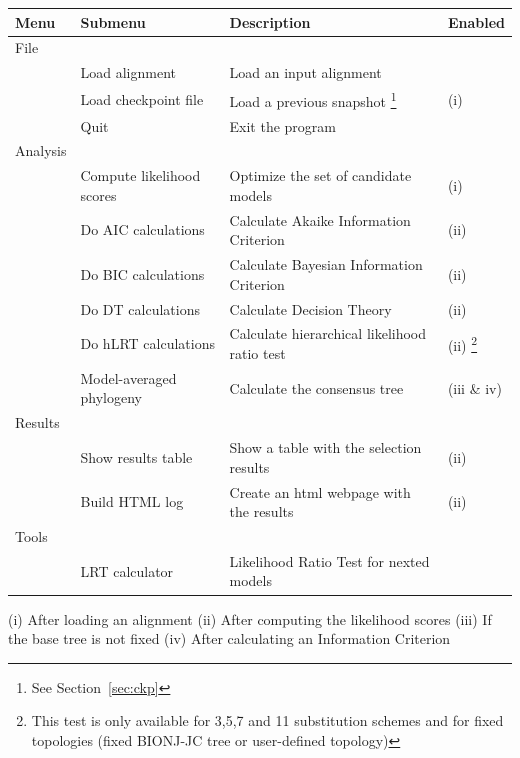 \documentclass[10pt,twoside,a4paper]{article}
\begin{document}
\begin{minipage}{1\textwidth}
\small
\begin{tabular}{l l l l}
\hline
{\bf Menu} & {\bf Submenu} & {\bf Description} & {\bf Enabled} \\
\hline
File \\
& Load alignment & Load an input alignment & \\
& Load checkpoint file & Load a previous snapshot \footnote{See Section~\ref{sec:ckp}} & (i) \\
& Quit & Exit the program & \\
\hline
Analysis \\
& Compute likelihood scores & Optimize the set of candidate models & (i) \\
& Do AIC calculations & Calculate Akaike Information Criterion & (ii) \\
& Do BIC calculations & Calculate Bayesian Information Criterion & (ii) \\
& Do DT calculations & Calculate Decision Theory & (ii) \\
& Do hLRT calculations & Calculate hierarchical likelihood ratio test & (ii) \footnote{This test is only available for 3,5,7 and 11 substitution schemes and for fixed topologies (fixed BIONJ-JC tree or user-defined topology)} \\
& Model-averaged phylogeny & Calculate the consensus tree & (iii \& iv)  \\
\hline
Results \\
& Show results table & Show a table with the selection results & (ii) \\
& Build HTML log & Create an html webpage with the results & (ii) \\
\hline
Tools \\
& LRT calculator & Likelihood Ratio Test for nexted models & \\
\hline
\end{tabular}

\vspace{1em}
(i) After loading an alignment (ii) After computing the likelihood scores (iii) If the base tree is not fixed (iv) After calculating an Information Criterion
\end{minipage}





\end{document}
